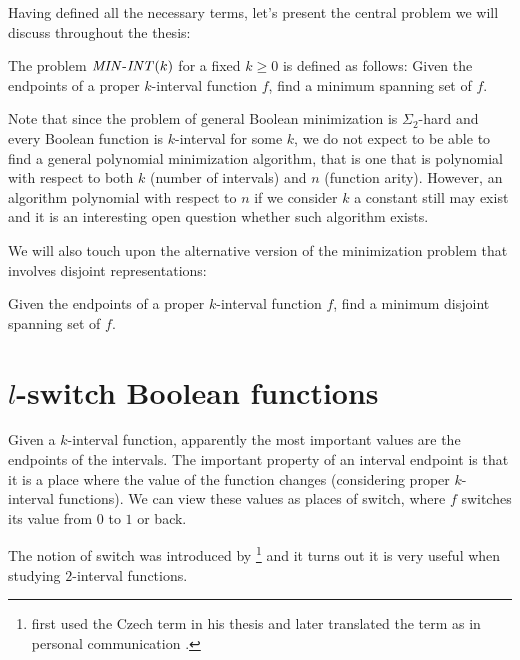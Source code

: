 Having defined all the necessary terms,
let's present the central problem
we will discuss throughout the thesis:
\begin{problem}
\label{problem:minint}
\label{problem:allintervalfnsminimization}
The problem $\mathit{MIN\text{-}INT} (k)$ for a fixed $k \geq 0$
is defined as follows:
Given the endpoints
of a proper $k$-interval function $f$,
find a minimum spanning set of $f$.
\end{problem}

Note that since the problem
of general Boolean minimization
is $\Sigma_2$-hard \citep{Umans1998}
and every Boolean function is $k$-interval for some $k$,
we do not expect to be able to find
a general polynomial minimization algorithm,
that is one that is polynomial
with respect to both $k$ (number of intervals) and $n$ (function arity).
However,
an algorithm polynomial with respect to $n$
if we consider $k$ a constant
still may exist and
it is an interesting open question whether such algorithm exists.

We will also touch upon the alternative version
of the minimization problem
that involves disjoint representations:
\begin{problem}
\label{problem:disjointminimum}
Given the endpoints
of a proper $k$-interval function $f$,
find a minimum disjoint spanning set of $f$.
\end{problem}

\section{\texorpdfstring{$l$}{l}-switch Boolean functions}
\label{sec:lswitch}

Given a $k$-interval function,
apparently the most important values are the endpoints of the intervals.
The important property of an interval endpoint is that
it is a place where the value of the function changes
(considering proper $k$-interval functions).
We can view these values as places of switch,
where $f$ switches its value from $0$ to $1$ or back.

The notion of switch was introduced by \citeauthor{Husek2014}\footnote{
\citeauthor{Husek2014} first used the Czech term
in his thesis \citep[p.~13]{Husek2014}
and later translated the term as 
in personal communication \citep{Husek2015}.
}
and it turns out it is very useful when studying $2$-interval functions.

